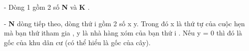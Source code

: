 - Dòng 1 gồm 2 số \textbf{ N } và \textbf{ K } .

- \textbf{ N } dòng tiếp theo, dòng thứ i gồm 2 số x y. Trong đó x là thứ tự của cuộc hẹn mà bạn thứ itham gia , y là nhà hàng xóm của bạn thứ i . Nếu y = 0 thì đó là gốc của khu dân cư (có thể hiểu là gốc của cây).